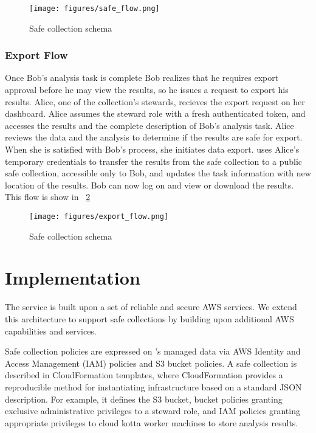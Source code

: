 \begin{figure}
  \center
  \texttt{[image: figures/safe\_flow.png]}
  \caption{Safe collection schema}
  \label{fig:flow1}
  \vspace{-1.5em}
\end{figure}


\subsubsection{Export Flow}

Once Bob's analysis task is complete Bob realizes that he requires export approval before he may view the
results, so he issues a request to export his results. Alice, one of the collection's stewards, recieves
the export request on her dashboard. Alice assumes
the steward role with a fresh authenticated token, and accesses the results and the complete description
of Bob's analysis task. Alice reviews the data and the analysis to determine if the results are
safe for export. When she is satisfied with Bob's process, she initiates data export. \NAME
uses Alice's temporary credentials to transfer the results from the safe collection to a public
safe collection, accessible only to Bob, and updates the task information with new location of the results. Bob can now log on
and view or download the results. This flow is show in \figurename~\ref{fig:flow2}

\begin{figure}
  \center
  \texttt{[image: figures/export\_flow.png]}
  \caption{Safe collection schema}
  \label{fig:flow2}
  \vspace{-1.5em}
\end{figure}



\section{Implementation}

The \NAME service is built upon a set of reliable and secure
AWS services. We extend this architecture to support safe collections
by building upon additional AWS capabilities and services.

Safe collection policies are expressed on \NAMENS's managed
data via AWS Identity and Access Management (IAM) policies
and S3 bucket policies.
A safe collection is described in CloudFormation templates, where
CloudFormation provides a reproducible method for instantiating infrastructure
based on a standard JSON description. For example, it defines
the S3 bucket, bucket policies granting exclusive administrative privileges to a steward role,
and IAM policies granting appropriate privileges to cloud kotta worker machines to store analysis results.

